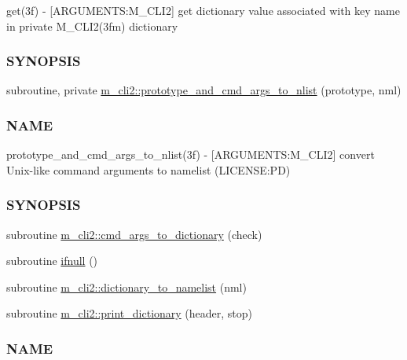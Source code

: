 \begin{DoxyCompactItemize}
\begin{DoxyCompactList}
get(3f) -\/ \mbox{[}A\+R\+G\+U\+M\+E\+N\+TS\+:M\+\_\+\+C\+L\+I2\mbox{]} get dictionary value associated with key name in private M\+\_\+\+C\+L\+I2(3fm) dictionary \subsubsection*{S\+Y\+N\+O\+P\+S\+IS}\end{DoxyCompactList}\item 
subroutine, private \mbox{\hyperlink{namespacem__cli2_a46f31858773ff1b4cf96329a14130bf2}{m\+\_\+cli2\+::prototype\+\_\+and\+\_\+cmd\+\_\+args\+\_\+to\+\_\+nlist}} (prototype, nml)
\begin{DoxyCompactList}\small\item\em \subsubsection*{N\+A\+ME}

prototype\+\_\+and\+\_\+cmd\+\_\+args\+\_\+to\+\_\+nlist(3f) -\/ \mbox{[}A\+R\+G\+U\+M\+E\+N\+TS\+:M\+\_\+\+C\+L\+I2\mbox{]} convert Unix-\/like command arguments to namelist (L\+I\+C\+E\+N\+SE\+:PD) \subsubsection*{S\+Y\+N\+O\+P\+S\+IS}\end{DoxyCompactList}\item 
subroutine \mbox{\hyperlink{namespacem__cli2_a3348b0c76dadd62c536e06f82bcb0331}{m\+\_\+cli2\+::cmd\+\_\+args\+\_\+to\+\_\+dictionary}} (check)
\item 
subroutine \mbox{\hyperlink{M__CLI2_8f90_aa26f90016621d1ee43d3b5b66316532b}{ifnull}} ()
\item 
subroutine \mbox{\hyperlink{namespacem__cli2_ab43e4e37723a0acc2183fbbf3d8c36bd}{m\+\_\+cli2\+::dictionary\+\_\+to\+\_\+namelist}} (nml)
\item 
subroutine \mbox{\hyperlink{namespacem__cli2_acbd726aa5c13b005a14c06d58915cb9a}{m\+\_\+cli2\+::print\+\_\+dictionary}} (header, stop)
\begin{DoxyCompactList}\small\item\em \subsubsection*{N\+A\+ME}


\end{DoxyCompactList}
\end{DoxyCompactItemize}
